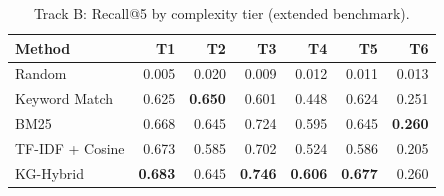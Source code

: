 \begin{table}[t]
\centering
\caption{Track B: Recall@5 by complexity tier (extended benchmark).}
\label{tab:extended-per-tier}
\begin{tabular}{lrrrrrr}
\toprule
Method & T1 & T2 & T3 & T4 & T5 & T6 \\
\midrule
Random & 0.005 & 0.020 & 0.009 & 0.012 & 0.011 & 0.013 \\
Keyword Match & 0.625 & \textbf{0.650} & 0.601 & 0.448 & 0.624 & 0.251 \\
BM25 & 0.668 & 0.645 & 0.724 & 0.595 & 0.645 & \textbf{0.260} \\
TF-IDF + Cosine & 0.673 & 0.585 & 0.702 & 0.524 & 0.586 & 0.205 \\
KG-Hybrid & \textbf{0.683} & 0.645 & \textbf{0.746} & \textbf{0.606} & \textbf{0.677} & 0.260 \\
\bottomrule
\end{tabular}
\end{table}